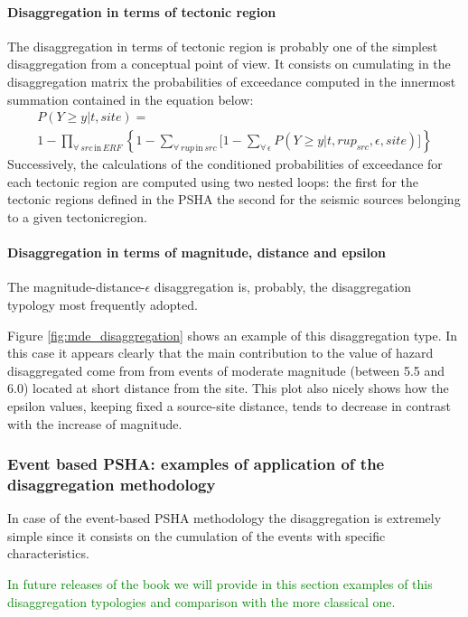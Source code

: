 \paragraph{Disaggregation in terms of tectonic region}
The disaggregation in terms of tectonic region is probably one of 
the simplest disaggregation from a conceptual point of view. 
%
It consists on cumulating in the disaggregation matrix the probabilities 
of exceedance computed in the innermost summation contained in the 
equation below:
\begin{multline}
P(Y \geq y|t,site) = \\
	1-\prod\limits_{\forall\,src\,\text{in}\,ERF}^{}  
	\left\{
		1-\sum\limits_{\forall\,rup\,\text{in}\,src}^{}
		\biggl[ 
			1-\sum\limits_{\forall\,\epsilon}^{} 
			P(Y \geq y|t,rup_{src},\epsilon,site)
		\biggr]
	\right\}
\label{eq:disaggregation_kernel}
\end{multline}
%
Successively, the calculations of the conditioned probabilities of 
exceedance for each tectonic region are computed using two nested
loops: the first for the tectonic regions defined in the PSHA the 
second for the seismic sources belonging to a given \gls{tectonicregion}. 
%
%
\paragraph{Disaggregation in terms of magnitude, distance and epsilon}
The magnitude-distance-$\epsilon$ disaggregation is, probably, the 
disaggregation typology most frequently adopted. 

Figure \ref{fig:mde_disaggregation} shows an example of this disaggregation
type. In this case it appears clearly that the main contribution to the 
value of hazard disaggregated come from from events of moderate magnitude 
(between 5.5 and 6.0) located at short distance from the site. 
%
This plot also nicely shows how the epsilon values, keeping fixed a 
source-site distance, tends to decrease in contrast with the increase 
of magnitude.
%
\subsubsection{Event based PSHA: examples of application of the 
disaggregation methodology}
%
In case of the event-based PSHA methodology the disaggregation is extremely 
simple since it consists on the cumulation of the events with specific 
characteristics. 

\textcolor{green}{
In future releases of the book we will provide in this section examples 
of this disaggregation typologies and comparison with the more classical 
one.
}
\color{black}
